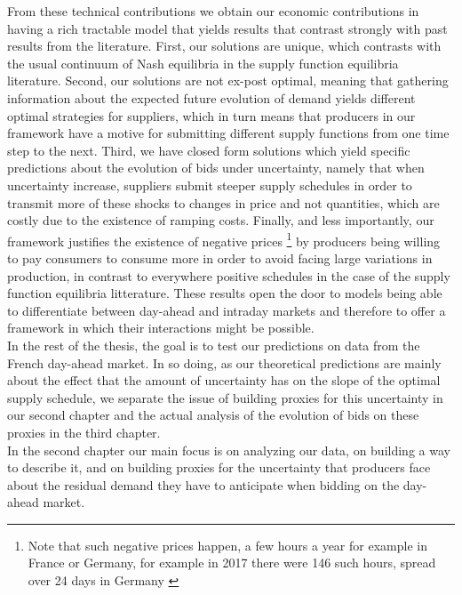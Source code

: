 From these technical contributions we obtain our economic contributions in having a rich tractable model that yields results that contrast strongly with past results from the literature. First, our solutions are unique, which contrasts with the usual continuum of Nash equilibria in the supply function equilibria literature. Second, our solutions are not ex-post optimal, meaning that gathering information about the expected future evolution of demand yields different optimal strategies for suppliers, which in turn means that producers in our framework have a motive for submitting different supply functions from one time step to the next. Third, we have closed form solutions which yield specific predictions about the evolution of bids under uncertainty, namely that when uncertainty increase, suppliers submit steeper supply schedules in order to transmit more of these shocks to changes in price and not quantities, which are costly due to the existence of ramping costs. Finally, and less importantly, our framework justifies the existence of negative prices \footnote{Note that such negative prices happen, a few hours a year for example in France or Germany, for example in 2017 there were 146 such hours, spread over 24 days in Germany \cite{epexnegP}} by producers being willing to pay consumers to consume more in order to avoid facing large variations in production, in contrast to everywhere positive schedules in the case of the supply function equilibria litterature. These results open the door to models being able to differentiate between day-ahead and intraday markets and therefore to offer a framework in which their interactions might be possible.\\

In the rest of the thesis, the goal is to test our predictions on data from the French day-ahead market. In so doing, as our theoretical predictions are mainly about the effect that the amount of uncertainty has on the slope of the optimal supply schedule, we separate the issue of building proxies for this uncertainty in our second chapter and the actual analysis of the evolution of bids on these proxies in the third chapter.\\

In the second chapter our main focus is on analyzing our data, on building a way to describe it, and on building proxies for the uncertainty that producers face about the residual demand they have to anticipate when bidding on the day-ahead market. \\

